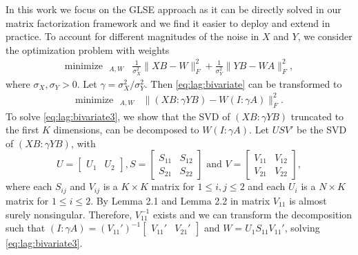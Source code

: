 \documentclass[preprint]{imsart}
\numberwithin{equation}{section}
\theoremstyle{plain}
\DeclareMathOperator*{\rank}{rank}
\DeclareMathOperator*{\minimize}{minimize\ \ }
\DeclareMathOperator*{\subjectto}{subject\ to\ \ }
\begin{document}
In this work we focus on the GLSE approach as it can be directly solved in our matrix factorization framework and we find it easier to deploy and extend in practice. %
To account for different magnitudes of the noise in $X$ and $Y$, we consider the optimization problem with weights
\begin{align}\label{eq:lag:bivariate}
  \minimize_{A,W} & \frac{1}{\sigma_X^2}\|XB - W \|_F^2 + \frac{1}{\sigma_Y^2} \| YB - WA \|_F^2,
\end{align}
where $\sigma_X,\sigma_Y > 0$. Let $\gamma = \sigma_X^2 / \sigma_Y^2$. Then \eqref{eq:lag:bivariate} can be transformed to
\begin{align}\label{eq:lag:bivariate3}
  \minimize_{A,W} & \| (XB : \gamma YB) - W(I: \gamma A) \|_F^2.%
\end{align}
To solve \eqref{eq:lag:bivariate3}, we show that the SVD of $(XB : \gamma YB)$ truncated to the first $K$ dimensions, can be decomposed to $W(I: \gamma A)$. Let $USV'$ be the SVD of $(XB : \gamma YB)$, with
\[
U = \begin{bmatrix}
  U_1 & U_2
\end{bmatrix},
S = \begin{bmatrix}
      S_{11} & S_{12}\\
      S_{21} & S_{22}
\end{bmatrix} 
\text{ and }
V = \begin{bmatrix}
      V_{11} & V_{12}\\
      V_{21} & V_{22}
    \end{bmatrix},
\]
where each $S_{ij}$ and $V_{ij}$ is a $K\times K$ matrix for $1 \leq i,j \leq 2$ and each $U_i$ is a $N \times K$ matrix for $1 \leq i \leq 2$. By Lemma 2.1 and Lemma 2.2 in \citep{gleser1981estimation} matrix $V_{11}$ is almost surely nonsingular. Therefore, $V_{11}^{-1}$ exists and we can transform the decomposition such that $(I : \gamma A) = (V_{11}')^{-1}\begin{bmatrix}V_{11}' & V_{21}'\end{bmatrix}$ and $W = U_1 S_{11} V_{11}'$, solving \eqref{eq:lag:bivariate3}.
\end{document}

